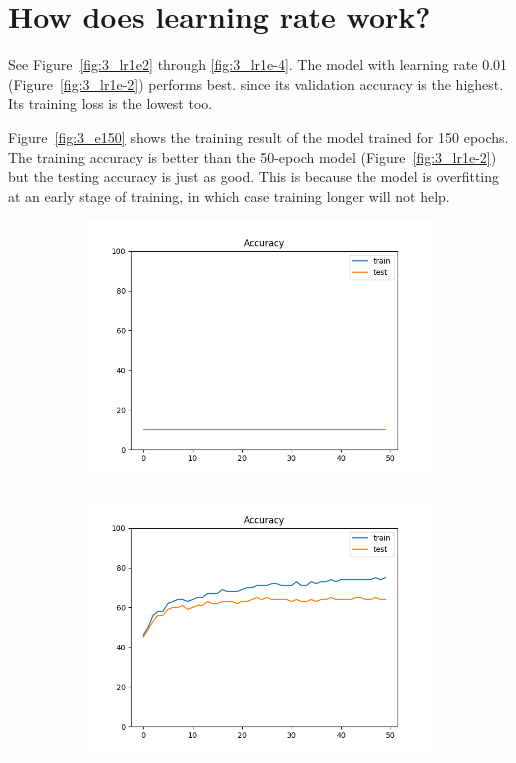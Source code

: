 \documentclass[12pt]{article}
\begin{document}
\section{How does learning rate work?}
See Figure~\ref{fig:3_lr1e2} through \ref{fig:3_lr1e-4}. The model with learning rate 0.01 (Figure~\ref{fig:3_lr1e-2}) performs best. since its validation accuracy is the highest. Its training loss is the lowest too.

Figure~\ref{fig:3_e150} shows the training result of the model trained for 150 epochs. The training accuracy is better than the 50-epoch model (Figure~\ref{fig:3_lr1e-2}) but the testing accuracy is just as good. This is because the model is overfitting at an early stage of training, in which case training longer will not help.

\begin{figure}
  \begin{subfigure}{0.19\textwidth}
    \centering
    \includegraphics[width=\linewidth]{accuracies_3_lr1e2.png}
  \end{subfigure}
  \begin{subfigure}{0.19\textwidth}
    \centering
    \includegraphics[width=\linewidth]{accuracies_3_lr1e-1.png}

\end{subfigure}
\end{figure}
\end{document}
